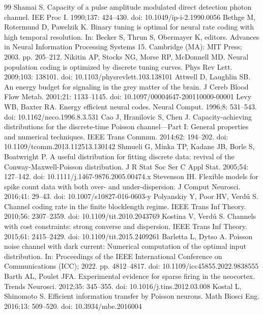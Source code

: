 \begin{thebibliography}{99}
 Shamai S. Capacity of a pulse amplitude modulated direct detection photon channel. IEE Proc I. 1990;137: 424--430. doi: 10.1049/ip-i-2.1990.0056
 Bethge M, Rotermund D, Pawelzik K. Binary tuning is optimal for neural rate coding with high temporal resolution. In: Becker S, Thrun S, Obermayer K, editors. Advances in Neural Information Processing Systems 15. Cambridge (MA): MIT Press; 2003. pp. 205--212.
 Nikitin AP, Stocks NG, Morse RP, McDonnell MD. Neural population coding is optimized by discrete tuning curves. Phys Rev Lett. 2009;103: 138101. doi: 10.1103/physrevlett.103.138101
 Attwell D, Laughlin SB. An energy budget for signaling in the grey matter of the brain. J Cereb Blood Flow Metab. 2001;21: 1133--1145. doi: 10.1097/00004647-200110000-00001
 Levy WB, Baxter RA. Energy efficient neural codes. Neural Comput. 1996;8: 531--543. doi: 10.1162/neco.1996.8.3.531
 Cao J, Hranilovic S, Chen J. Capacity-achieving distributions for the discrete-time Poisson channel---Part I: General properties and numerical techniques. IEEE Trans Commun. 2014;62: 194--202. doi: 10.1109/tcomm.2013.112513.130142
 Shmueli G, Minka TP, Kadane JB, Borle S, Boatwright P. A useful distribution for fitting discrete data: revival of the Conway-Maxwell-Poisson distribution. J R Stat Soc Ser C Appl Stat. 2005;54: 127--142. doi: 10.1111/j.1467-9876.2005.00474.x
 Stevenson IH. Flexible models for spike count data with both over- and under-dispersion. J Comput Neurosci. 2016;41: 29--43. doi: 10.1007/s10827-016-0603-y
 Polyanskiy Y, Poor HV, Verdú S. Channel coding rate in the finite blocklength regime. IEEE Trans Inf Theory. 2010;56: 2307--2359. doi: 10.1109/tit.2010.2043769
 Kostina V, Verdú S. Channels with cost constraints: strong converse and dispersion. IEEE Trans Inf Theory. 2015;61: 2415--2429. doi: 10.1109/tit.2015.2409261
 Barletta L, Dytso A. Poisson noise channel with dark current: Numerical computation of the optimal input distribution. In: Proceedings of the IEEE International Conference on Communications (ICC); 2022. pp. 4812--4817. doi: 10.1109/icc45855.2022.9838555
 Barth AL, Poulet JFA. Experimental evidence for sparse firing in the neocortex. Trends Neurosci. 2012;35: 345--355. doi: 10.1016/j.tins.2012.03.008
 Kostal L, Shinomoto S. Efficient information transfer by Poisson neurons. Math Biosci Eng. 2016;13: 509--520. doi: 10.3934/mbe.2016004

\end{thebibliography}
